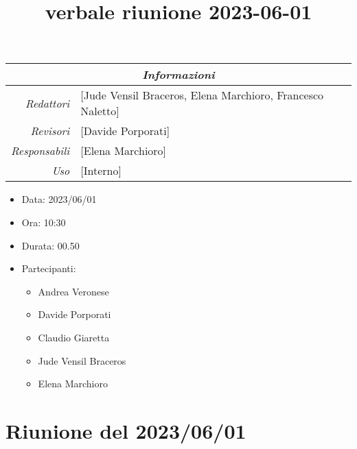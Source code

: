 \documentclass[12pt]{article}
\begin{document}
\graphicspath{ {../../templates/img} }

\title{verbale riunione 2023-06-01}

\firstPage
\maketitle

\begin{center}
\begin{tabular}{r | l}
    \multicolumn{2}{c}{\textit{Informazioni}}\\
    \hline
    
        \textit{Redattori} &
        [Jude Vensil Braceros, Elena Marchioro, Francesco Naletto]\makecell{}\\
    
        \textit{Revisori} &
        [Davide Porporati]\makecell{}\\
        \textit{Responsabili} &
        [Elena Marchioro]\makecell{}\\
            \textit{Uso} & 
            [Interno]\makecell{}\\
\end{tabular}
    \begin{itemize}
    \item[] Data: 2023/06/01
    \item[] Ora: 10:30
    \item[] Durata: 00.50
    \item[] Partecipanti:
    \begin{itemize}
    \item[] Andrea Veronese
    \item[] Davide Porporati
    \item[] Claudio Giaretta
    \item[] Jude Vensil Braceros
    \item[] Elena Marchioro
    \end{itemize}
    \end{itemize}
\end{center}


\tableofcontents
\printindex 
\section{Riunione del 2023/06/01}
\end{document}
